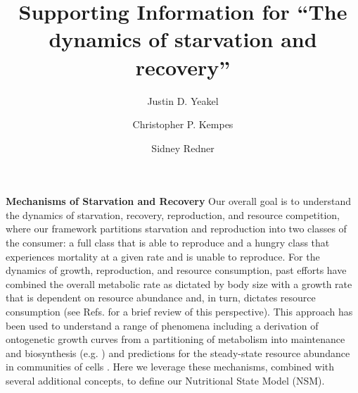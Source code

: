 \documentclass[twocolumn,preprintnumbers,amsmath,amssymb,superscriptaddress]{revtex4}
\begin{document}
\author{Justin D. Yeakel} 

\author{Christopher P. Kempes} 

\author{Sidney Redner} 

\title{ Supporting Information for ``The dynamics of starvation and recovery''}%



\maketitle





\clearpage



{\bf Mechanisms of Starvation and Recovery}
Our overall goal is to understand the dynamics of starvation, recovery, reproduction, and resource competition, where our framework partitions starvation and reproduction into two classes of the consumer: a full class that is able to reproduce and a hungry class that experiences mortality at a given rate and is unable to reproduce. For the dynamics of growth, reproduction, and resource consumption, past efforts have combined the overall metabolic rate as dictated by body size with a growth rate that is dependent on resource abundance and, in turn, dictates resource consumption (see Refs. \citep{Kempes:2012hy,kempes2014morphological} for a brief review of this perspective). This approach has been used to understand a range of phenomena including a derivation of ontogenetic growth curves from a partitioning of metabolism into maintenance and biosynthesis (e.g. \citep{West:2001bv,moses2008rmo,hou,Kempes:2012hy}) and predictions for the steady-state resource abundance in communities of cells \citep{kempes2014morphological}. Here we leverage these mechanisms, combined with several additional concepts, to define our Nutritional State Model (NSM).
\end{document}
